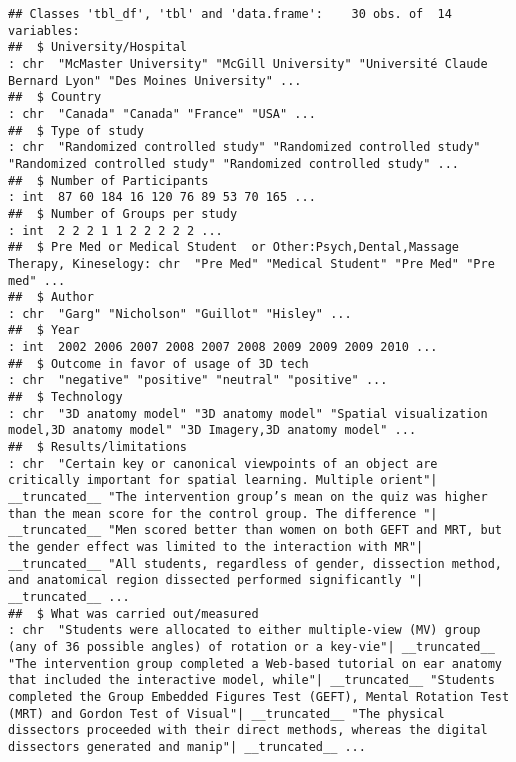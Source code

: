 \documentclass[]{article}
\begin{document}
\begin{verbatim}
## Classes 'tbl_df', 'tbl' and 'data.frame':    30 obs. of  14 variables:
##  $ University/Hospital                                                          : chr  "McMaster University" "McGill University" "Université Claude Bernard Lyon" "Des Moines University" ...
##  $ Country                                                                      : chr  "Canada" "Canada" "France" "USA" ...
##  $ Type of study                                                                : chr  "Randomized controlled study" "Randomized controlled study" "Randomized controlled study" "Randomized controlled study" ...
##  $ Number of Participants                                                       : int  87 60 184 16 120 76 89 53 70 165 ...
##  $ Number of Groups per study                                                   : int  2 2 2 1 1 2 2 2 2 2 ...
##  $ Pre Med or Medical Student  or Other:Psych,Dental,Massage Therapy, Kineselogy: chr  "Pre Med" "Medical Student" "Pre Med" "Pre med" ...
##  $ Author                                                                       : chr  "Garg" "Nicholson" "Guillot" "Hisley" ...
##  $ Year                                                                         : int  2002 2006 2007 2008 2007 2008 2009 2009 2009 2010 ...
##  $ Outcome in favor of usage of 3D tech                                         : chr  "negative" "positive" "neutral" "positive" ...
##  $ Technology                                                                   : chr  "3D anatomy model" "3D anatomy model" "Spatial visualization model,3D anatomy model" "3D Imagery,3D anatomy model" ...
##  $ Results/limitations                                                          : chr  "Certain key or canonical viewpoints of an object are critically important for spatial learning. Multiple orient"| __truncated__ "The intervention group’s mean on the quiz was higher than the mean score for the control group. The difference "| __truncated__ "Men scored better than women on both GEFT and MRT, but the gender effect was limited to the interaction with MR"| __truncated__ "All students, regardless of gender, dissection method, and anatomical region dissected performed significantly "| __truncated__ ...
##  $ What was carried out/measured                                                : chr  "Students were allocated to either multiple-view (MV) group (any of 36 possible angles) of rotation or a key-vie"| __truncated__ "The intervention group completed a Web-based tutorial on ear anatomy that included the interactive model, while"| __truncated__ "Students completed the Group Embedded Figures Test (GEFT), Mental Rotation Test (MRT) and Gordon Test of Visual"| __truncated__ "The physical dissectors proceeded with their direct methods, whereas the digital dissectors generated and manip"| __truncated__ ...

\end{verbatim}
\end{document}
